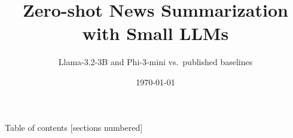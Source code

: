 \documentclass[10pt]{beamer}
\title{Zero-shot News Summarization with Small LLMs}
\subtitle{Llama-3.2-3B and Phi-3-mini vs.\ published baselines}
\date{\today}
\author{}
\institute{}
\begin{document}
\maketitle

\begin{frame}{Table of contents}
  [sections numbered]
  \tableofcontents[hideallsubsections]
\end{frame}


\end{document}
